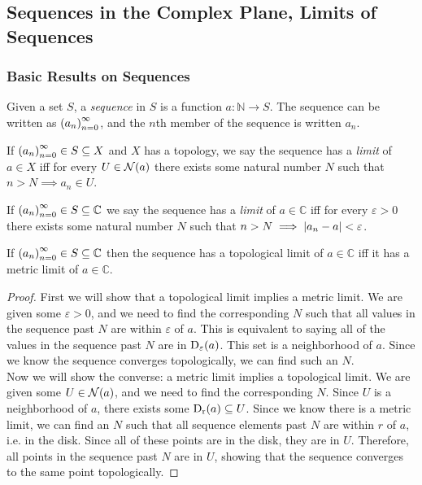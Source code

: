\subsection{Sequences in the Complex Plane, Limits of Sequences}
\subsubsection{Basic Results on Sequences}
\begin{definition}[Sequence]
Given a set $S$, a \emph{sequence} in $S$ is a function $a : \mathbb{N} \longrightarrow S$. The sequence can be written as $\seq{a}$, and the $n$th member of the sequence is written $a_n$.
\end{definition}
\begin{definition}
If $\seq{a} \in S \subseteq X$ and $X$ has a topology, we say the sequence has a \emph{limit} of $a \in X$ iff for every $U \in \nbhd{a}$ there exists some natural number $N$ such that $n>N \implies a_n \in U$.
\end{definition}
\begin{definition}
If $\seq{a} \in S \subseteq \mathbb{C}$ we say the sequence has a \emph{limit} of $a \in \mathbb{C}$ iff for every $\varepsilon > 0$ there exists some natural number $N$ such that $n > N \implies \modulus{a_n-a} < \varepsilon$.
\end{definition}
\begin{theorem}
If $\seq{a} \in S \subseteq \mathbb{C}$ then the sequence has a topological limit of $a \in \mathbb{C}$ iff it has a metric limit of $a \in \mathbb{C}$.
\end{theorem}
\begin{proof}
First we will show that a topological limit implies a metric limit. We are given some $\varepsilon > 0$, and we need to find the corresponding $N$ such that all values in the sequence past $N$ are within $\varepsilon$ of $a$. This is equivalent to saying all of the values in the sequence past $N$ are in $\disk{a}{\varepsilon}$. This set is a neighborhood of $a$. Since we know the sequence converges topologically, we can find such an $N$.\\
Now we will show the converse: a metric limit implies a topological limit. We are given some $U \in \nbhd{a}$, and we need to find the corresponding $N$. Since $U$ is a neighborhood of $a$, there exists some $\disk{a}{r} \subseteq U$. Since we know there is a metric limit, we can find an $N$ such that all sequence elements past $N$ are within $r$ of $a$, i.e. in the disk. Since all of these points are in the disk, they are in $U$. Therefore, all points in the sequence past $N$ are in $U$, showing that the sequence converges to the same point topologically.
\end{proof}
